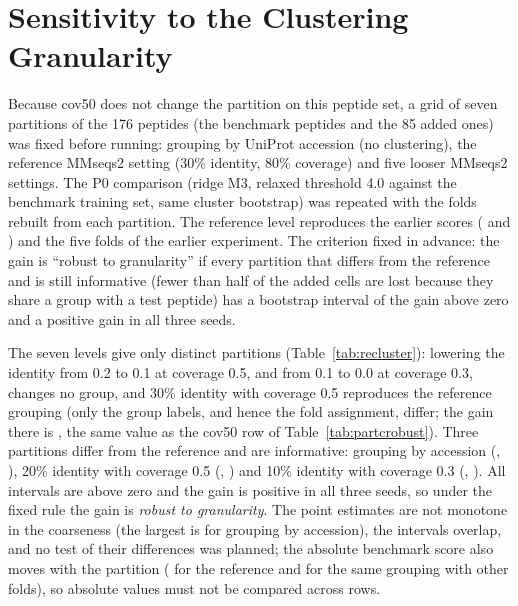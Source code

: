 \section{Sensitivity to the Clustering Granularity}\label{sec:res-recluster}
Because cov50 does not change the partition on this peptide set, a grid of seven partitions of the 176 peptides
(the \nNPep{} benchmark peptides and the 85 added ones) was fixed before running: grouping by UniProt accession
(no clustering), the reference MMseqs2 setting (30\% identity, 80\% coverage) and five looser MMseqs2 settings. The P0
comparison (ridge M3, relaxed threshold 4.0 against the benchmark training set, same cluster bootstrap) was repeated with the
folds rebuilt from each partition. The reference level reproduces the earlier scores (\nAucRidge{} and \nAucRidgeExt) and the five
folds of the earlier experiment. The criterion fixed in advance: the gain is ``robust to granularity'' if every
partition that differs from the reference and is still informative (fewer than half of the added cells are lost because they
share a group with a test peptide) has a bootstrap interval of the gain above zero and a positive gain in all three seeds.

\begin{table}[htbp]
  \centering
  \caption[Gain of the relaxed threshold 4.0 (ridge M3) under different protein partitions]{Gain of the relaxed threshold 4.0 (ridge M3) under different protein partitions. ``Groups'' are the groups of the
  91 benchmark peptides and of all 176 peptides; ``Shared'' is the number of added peptides that fall in a group of a
  benchmark peptide; ``Excl.'' is the mean percentage of the added cells that are removed from training because their
  group contains a test peptide.}\label{tab:recluster}
  
\end{table}

The seven levels give only \nRcNDistinct{} distinct partitions (Table~\ref{tab:recluster}): lowering the identity from 0.2 to 0.1
at coverage 0.5, and from 0.1 to 0.0 at coverage 0.3, changes no group, and 30\% identity with coverage 0.5 reproduces the
reference grouping (only the group labels, and hence the fold assignment, differ; the gain there is
\nRcFiftyD{} \nRcFiftyCI{}, the same value as the cov50 row of Table~\ref{tab:partcrobust}). Three partitions differ from the
reference and are informative: grouping by accession (\nRcAccD{}, \nRcAccCI{}), 20\% identity with coverage 0.5 (\nRcMidD{}, \nRcMidCI{}) and
10\% identity with coverage 0.3 (\nRcCoarseD{}, \nRcCoarseCI{}). All intervals are above zero and the gain is positive in all
three seeds, so under the fixed rule the gain is \emph{robust to granularity}. The point estimates are not monotone in the
coarseness (the largest is for grouping by accession), the intervals overlap, and no test of their differences was
planned; the absolute benchmark score also moves with the partition (\nAucRidge{} for the reference and \nRcFiftyBase{} for the same grouping with
other folds), so absolute values must not be compared across rows.

